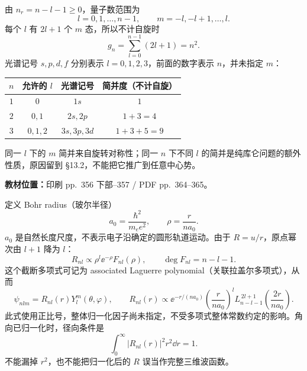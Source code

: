由 $n_r=n-l-1\geq0$，量子数范围为
\begin{equation}
  \boxed{l=0,1,\ldots,n-1,\qquad m=-l,-l+1,\ldots,l.}
\end{equation}
每个 $l$ 有 $2l+1$ 个 $m$ 态，所以不计自旋时
\begin{equation}
  \boxed{g_n=\sum_{l=0}^{n-1}(2l+1)=n^2.}
\end{equation}
光谱记号 $s,p,d,f$ 分别表示 $l=0,1,2,3$，前面的数字表示 $n$，并未指定 $m$：
\begin{center}
\begin{tabular}{@{}cccc@{}}
  \toprule
  $n$ & 允许的 $l$ & 光谱记号 & 简并度（不计自旋） \\
  \midrule
  $1$ & $0$ & $1s$ & $1$ \\
  $2$ & $0,1$ & $2s,2p$ & $1+3=4$ \\
  $3$ & $0,1,2$ & $3s,3p,3d$ & $1+3+5=9$ \\
  \bottomrule
\end{tabular}
\end{center}
同一 $l$ 下的 $m$ 简并来自旋转对称性；同一 $n$ 下不同 $l$ 的简并是纯库仑问题的额外性质，原因留到 \S 13.2，不能把它推广到任意中心势。


\textbf{教材位置：}印刷 pp.~356 下部--357 / PDF pp.~364--365。

定义 Bohr radius（玻尔半径）
\begin{equation}
  \boxed{a_0=\frac{\hbar^2}{m_e e^2},\qquad \rho=\frac{r}{na_0}.}
\end{equation}
$a_0$ 是自然长度尺度，不表示电子沿确定的圆形轨道运动。由于 $R=u/r$，原点幂次由 $l+1$ 降为 $l$：
\begin{equation}
  R_{nl}\propto\rho^l\ee^{-\rho}F_{nl}(\rho),
  \qquad \deg F_{nl}=n-l-1.
\end{equation}
这个截断多项式可记为 associated Laguerre polynomial（关联拉盖尔多项式），从而
\begin{equation}
  \boxed{\psi_{nlm}=R_{nl}(r)Y_l^m(\theta,\varphi),\qquad
  R_{nl}(r)\propto\ee^{-r/(na_0)}
    \left(\frac{r}{na_0}\right)^l
    L_{n-l-1}^{\,2l+1}\!\left(\frac{2r}{na_0}\right).}
\end{equation}
此式使用正比号，整体归一化因子尚未指定，不受多项式整体常数约定的影响。角向已归一化时，径向条件是
\begin{equation}
  \int_0^\infty|R_{nl}(r)|^2r^2\dd r=1.
\end{equation}
不能漏掉 $r^2$，也不能把归一化后的 $R$ 误当作完整三维波函数。


